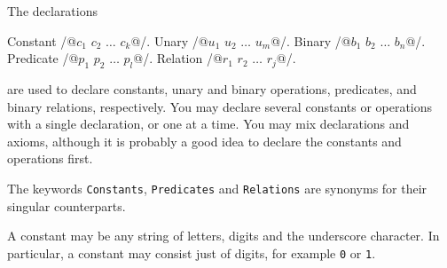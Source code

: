 \documentclass{article}
\begin{document}
The declarations
%
\begin{source}
Constant /@$c_1$ $c_2$ $\ldots$ $c_k$@/.
Unary /@$u_1$ $u_2$ $\ldots$ $u_m$@/.
Binary /@$b_1$ $b_2$ $\ldots$ $b_n$@/.
Predicate /@$p_1$ $p_2$ $\ldots$ $p_l$@/.
Relation /@$r_1$ $r_2$ $\ldots$ $r_j$@/.
\end{source}
%
are used to declare constants, unary and binary operations,
predicates, and binary relations, respectively. You may declare
several constants or operations with a single declaration, or one at a
time. You may mix declarations and axioms, although it is probably a
good idea to declare the constants and operations first.

The keywords \texttt{Constants}, \texttt{Predicates} and
\texttt{Relations} are synonyms for their singular counterparts.

A constant may be any string of letters, digits and the underscore
character. In particular, a constant may consist just of digits, for
example \texttt{0} or \texttt{1}.
\end{document}
